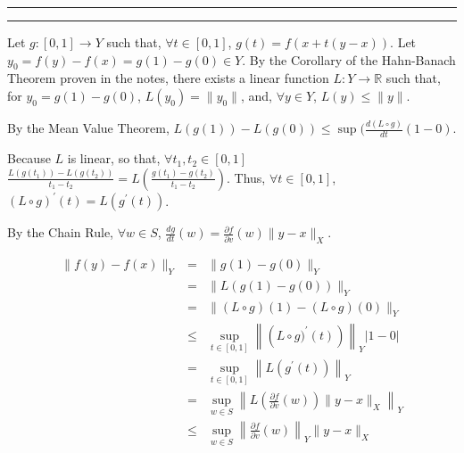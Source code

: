 \documentclass[11pt]{article}
\newcounter{questionCounter}
\newcounter{partCounter}[questionCounter]
\newenvironment{question}[2][\arabic{questionCounter}]{%
    \setcounter{partCounter}{0}%
    \vspace{.25in} \hrule \vspace{0.5em}%
        \noindent{\bf #2}%
    \vspace{0.8em} \hrule \vspace{.10in}%
    \addtocounter{questionCounter}{1}%
}{}
\begin{document}
\begin{question}{Problem 2}
Let $g: [0,1] \rightarrow Y$ such that, $\forall t \in [0,1]$,
$g(t) = f(x + t(y - x))$. Let $y_0 = f(y) - f(x) = g(1) - g(0) \in Y$. By the
Corollary of the Hahn-Banach Theorem proven in the notes, there exists a
linear function $L: Y \rightarrow \mathbb{R}$ such that, for
$y_0 = g(1) - g(0)$, $L(y_0) = \|y_0\|$, and,
$\forall y \in Y$, $L(y) \leq \|y\|$.

By the Mean Value Theorem,
$L(g(1)) - L(g(0)) \leq \sup(\frac{d (L \circ g)}{dt} (1 - 0)$.

Because $L$ is linear, so that, $\forall t_1, t_2 \in [0,1]$
$\frac{L(g(t_1)) - L(g(t_2))}{t_1 - t_2} = L\left(\frac{g(t_1) - g(t_2)}{t_1 - t_2}\right)$.
Thus, $\forall t \in [0,1]$, $(L \circ g)^{\prime}(t)  = L(g^{\prime}(t))$.

By the Chain Rule, $\forall w \in S$,
$\frac{d g}{d t}(w)
 = \frac{\partial f}{\partial v}(w) \|y - x\|_X$.

\begin{eqnarray*}
\|f(y) - f(x)\|_Y
 & =    & \|g(1) - g(0)\|_Y \\
 & =    & \|L(g(1) - g(0))\|_Y \\
 & =    & \|(L \circ g)(1) - (L \circ g)(0)\|_Y \\
 & \leq & \sup_{t \in [0,1]} \left\|\left(L \circ g)^{\prime}(t)\right)\right\|_Y|1 - 0| \\
 & =    & \sup_{t \in [0,1]} \left\| L (g^{\prime}(t)) \right\|_Y \\
 & =    & \sup_{w \in S}\left\| L \left(\frac{\partial f}{\partial v}(w)\right)\| y - x \|_X \right\|_Y \\
 & \leq & \sup_{w \in S}\left\| \frac{\partial f}{\partial v}(w) \right\|_Y \| y - x \|_X \\
\end{eqnarray*}
\end{question}
\end{document}
